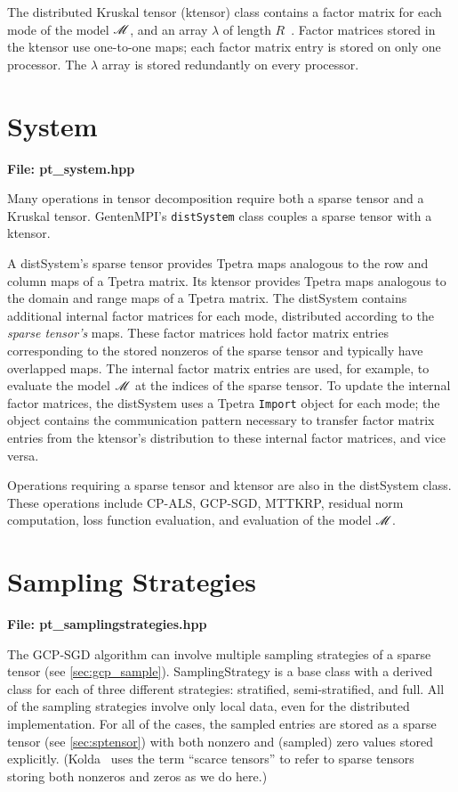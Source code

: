 The distributed Kruskal tensor (ktensor) class contains a factor matrix for
each mode of the model $\M$, and an array $\lambda$ of length $R$~\cite{TTB_Sparse}.
Factor matrices stored in the ktensor use one-to-one maps; each factor
matrix entry is stored on only one processor. 
The $\lambda$ array is stored redundantly on every processor.

\section{System} \label{sec:system}

{\bf File:  pt\_system.hpp}

Many operations in tensor decomposition require both a sparse tensor and 
a Kruskal tensor.  GentenMPI's {\tt distSystem} class couples a sparse tensor
with a ktensor. 


A distSystem's sparse tensor provides Tpetra maps analogous to the row
and column maps of a Tpetra matrix. Its ktensor provides Tpetra maps 
analogous to the domain and range maps of a Tpetra matrix.  
The distSystem contains additional internal factor matrices for each mode, 
distributed according to the \emph{sparse tensor's} maps. These factor
matrices hold factor matrix entries corresponding to the stored 
nonzeros of the sparse tensor and typically have overlapped maps.
The internal factor matrix entries are used, for example, to evaluate
the model $\M$ at the indices of the sparse tensor.
To update the internal factor matrices, the distSystem uses
a Tpetra {\tt Import} object for each mode; the object contains the 
communication pattern necessary to transfer factor matrix entries from the
ktensor's distribution to these internal factor matrices, and vice versa.  

Operations requiring a sparse tensor and ktensor are also in the 
distSystem class.  These operations include CP-ALS, GCP-SGD, MTTKRP,
residual norm computation, loss function evaluation, and 
evaluation of the model $\T M$.

\section{Sampling Strategies} \label{sec:sampling}

{\bf File:  pt\_samplingstrategies.hpp}

The GCP-SGD algorithm \cite{KH19} can involve multiple sampling strategies of a sparse tensor (see \cref{sec:gcp_sample}).
SamplingStrategy is a base class with a derived class for each of three different strategies: stratified, semi-stratified, and full.
All of the sampling strategies involve only local data, even for the distributed implementation.
For all of the cases, the sampled entries are stored as a sparse tensor (see \cref{sec:sptensor}) with both nonzero and (sampled) zero values stored explicitly.
(Kolda~\cite{koldablog} uses the term ``scarce tensors'' to refer to sparse 
tensors storing both nonzeros and zeros as we do here.)

